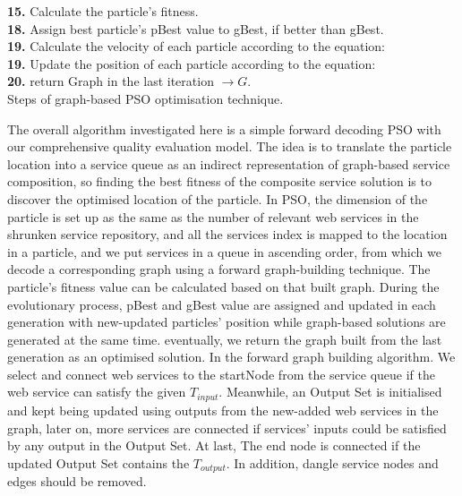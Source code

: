 \documentclass{llncs}
\begin{document}
\begin{algorithm}[!htb]
{{			\textbf{15.} Calculate the particle's fitness.\\
		}
		\textbf{18.} Assign best particle's pBest value to gBest, if better than gBest.\\
		\textbf{19.} Calculate the velocity of each particle according to the equation:\\
		\textbf{19.} Update the position of each particle according to the equation:\\
	}
		\textbf{20.} return Graph in the last iteration $ \rightarrow G$.\\
	
 \caption{Steps of graph-based PSO optimisation technique.}
\label{psoSteps}
\end{algorithm}
The overall algorithm investigated here is a simple forward decoding PSO \cite{da2016particle} with our comprehensive quality evaluation model. The idea is to translate the particle location into a service queue as an indirect representation of graph-based service composition, so finding the best fitness of the composite service solution is to discover the optimised location of the particle. In PSO, the dimension of the particle is set up as the same as the number of relevant web services in the shrunken service repository, and all the services index is mapped to the location in a particle, and we put services in a queue in ascending order, from which we decode a corresponding graph using a forward graph-building technique. The particle's fitness value can be calculated based on that built graph. During the evolutionary process, pBest and gBest value are assigned and updated in each generation with new-updated particles' position while graph-based solutions are generated at the same time. eventually, we return the graph built from the last generation as an optimised solution. In the forward graph building algorithm. We select and connect web services to the startNode from the service queue if the web service can satisfy the given $T_{input}$. Meanwhile, an Output Set is initialised and kept being updated using outputs from the new-added web services in the graph, later on, more services are connected if services' inputs could be satisfied by any output in the Output Set. At last, The end node is connected if the updated Output Set contains the $T_{output}$. In addition, dangle service nodes and edges should be removed. 
\end{document}
